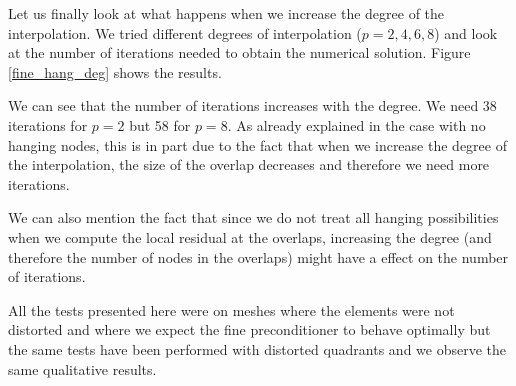 Let us finally look at what happens when we increase the degree of the interpolation. We tried different degrees of interpolation ($p=2,4,6,8$) and look at the number of iterations needed to obtain the numerical solution. Figure \ref{fine_hang_deg} shows the results.  

We can see that the number of iterations increases with the degree. We need 38 iterations for $p=2$ but 58 for $p=8$. As already explained in the case with no hanging nodes, this is in part due to the fact that when we increase the degree of the interpolation, the size of the overlap decreases and therefore we need more iterations.

We can also mention the fact that since we do not treat all hanging possibilities when we compute the local residual at the overlaps, increasing the degree (and therefore the number of nodes in the overlaps) might have a effect on the number of iterations.

All the tests presented here were on meshes where the elements were not distorted and where we expect the fine preconditioner to behave optimally but the same tests have been performed with distorted quadrants and we observe the same qualitative results. 


 



 
